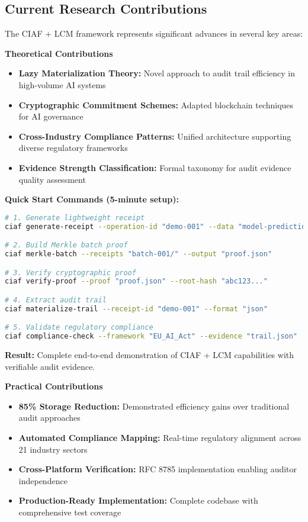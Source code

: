 \documentclass[12pt,a4paper]{article}
\begin{document}
\subsection{Current Research Contributions}

The CIAF + LCM framework represents significant advances in several key areas:

\begin{valuebox}
\textbf{Theoretical Contributions}
\begin{itemize}
\item \textbf{Lazy Materialization Theory:} Novel approach to audit trail efficiency in high-volume AI systems
\item \textbf{Cryptographic Commitment Schemes:} Adapted blockchain techniques for AI governance
\item \textbf{Cross-Industry Compliance Patterns:} Unified architecture supporting diverse regulatory frameworks
\item \textbf{Evidence Strength Classification:} Formal taxonomy for audit evidence quality assessment
\end{itemize}

\begin{tcolorbox}[colframe=blue!70, colback=green!8, title={\textbf{Reproduce the Demo}}]
\textbf{Quick Start Commands (5-minute setup):}
\begin{lstlisting}[language=bash]
# 1. Generate lightweight receipt
ciaf generate-receipt --operation-id "demo-001" --data "model-predictions.json"

# 2. Build Merkle batch proof
ciaf merkle-batch --receipts "batch-001/" --output "proof.json"

# 3. Verify cryptographic proof
ciaf verify-proof --proof "proof.json" --root-hash "abc123..."

# 4. Extract audit trail
ciaf materialize-trail --receipt-id "demo-001" --format "json"

# 5. Validate regulatory compliance
ciaf compliance-check --framework "EU_AI_Act" --evidence "trail.json"
\end{lstlisting}
\textbf{Result:} Complete end-to-end demonstration of CIAF + LCM capabilities with verifiable audit evidence.
\end{tcolorbox}

\textbf{Practical Contributions}
\begin{itemize}
\item \textbf{85\% Storage Reduction:} Demonstrated efficiency gains over traditional audit approaches
\item \textbf{Automated Compliance Mapping:} Real-time regulatory alignment across 21 industry sectors
\item \textbf{Cross-Platform Verification:} RFC 8785 implementation enabling auditor independence
\item \textbf{Production-Ready Implementation:} Complete codebase with comprehensive test coverage
\end{itemize}
\end{valuebox}
\end{document}
